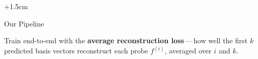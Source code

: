 \documentclass[final,t]{beamer}
\newlength{\colwidthA}\setlength{\colwidthA}{51.4cm}
\begin{document}
\begin{frame}[t,fragile]
\begin{columns}[t, onlytextwidth]
\begin{column}{\colwidthA+1.5cm\relax}
{\begin{block}{\LARGE Our Pipeline}
  \begin{minipage}[c]{0.45\linewidth}\LARGE\justifying
    \noindent Train end-to-end with the \textbf{average
    reconstruction loss}\,---\,how well the first $k$ predicted basis
    vectors reconstruct each probe $f^{(i)}$, averaged over $i$ and $k$.
  \end{minipage}\hfill
  \begin{minipage}[c]{0.52\linewidth}\centering
    {\setlength{\fboxsep}{0.8em}\setlength{\fboxrule}{0.6pt}%
    }
  \end{minipage}
\end{block}
}%
\newcommand{\bigTitleSetup}[1]{%
  \setbeamertemplate{block begin}{%
    \begin{lrbox}{\posterBlockBox}%
    \begin{minipage}{\dimexpr\textwidth-1.2pt-16pt\relax}%
    \begin{beamercolorbox}[wd=\linewidth, ht=3.4ex, dp=1.8ex, leftskip=1ex, rightskip=1ex]{block title}
      \insertblocktitle
    \end{beamercolorbox}
    \begin{beamercolorbox}[wd=\linewidth, leftskip=1ex, rightskip=1ex, vmode]{block body}
      \vspace{0.25ex}
      \justifying
  }%
  \setbeamertemplate{block end}{%
      \vspace{0.5ex}
    \end{beamercolorbox}
}}
\end{column}
\end{columns}
\end{frame}
\end{document}
